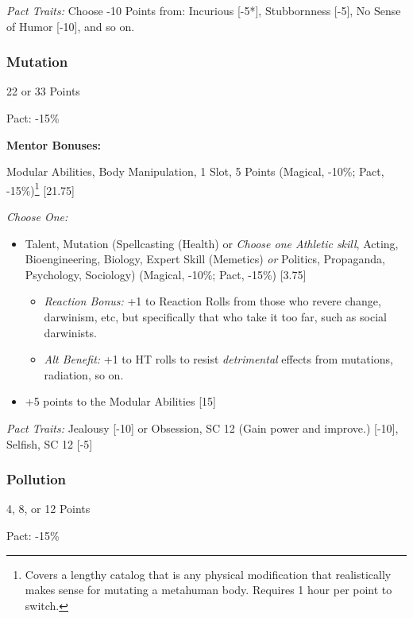 \begin{multicols}{3}
	\textit{Pact Traits:} Choose -10 Points from: Incurious [-5*], Stubbornness [-5], No Sense of Humor [-10], and so on.
	
	\subsubsection{Mutation}
	\begin{flushright}
		22 or 33 Points
	\end{flushright}
	Pact: -15\%
	
	
	\textbf{Mentor Bonuses:} 
	
	Modular Abilities, Body Manipulation, 1 Slot, 5 Points (Magical, -10\%; Pact, -15\%)\footnote{Covers a lengthy catalog that is any physical modification that realistically makes sense for mutating a metahuman body. Requires 1 hour per point to switch.} [21.75]
	
	\textit{Choose One:}
	\begin{itemize}
		\itemsep 0pt
		\item Talent, Mutation (Spellcasting (Health) or \textit{Choose one Athletic skill}, Acting, Bioengineering, Biology, Expert Skill (Memetics) \textit{or} Politics, Propaganda, Psychology, Sociology) (Magical, -10\%; Pact, -15\%) [3.75]
		\begin{itemize}
			\itemsep 0pt
			\item \textit{Reaction Bonus:} +1 to Reaction Rolls from those who revere change, darwinism, etc, but specifically that who take it too far, such as social darwinists.
			\item \textit{Alt Benefit:} +1 to HT rolls to resist \textit{detrimental} effects from mutations, radiation, so on.
		\end{itemize}
		\item +5 points to the Modular Abilities [15]
	\end{itemize}
	
	\textit{Pact Traits:} Jealousy [-10] or Obsession, SC 12 (Gain power and improve.) [-10], Selfish, SC 12 [-5]
	
	\subsubsection{Pollution}
	\begin{flushright}
		4, 8, or 12 Points
	\end{flushright}
	Pact: -15\%
	
	

\end{multicols}
